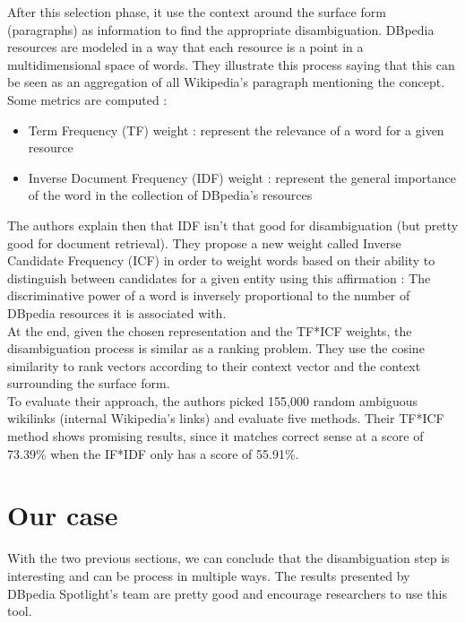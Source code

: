After this selection phase, it use the context around the surface form (paragraphs) as information to find the appropriate disambiguation. DBpedia resources are modeled in a way that each resource is a point in a multidimensional space of words. They illustrate this process saying that this can be seen as an aggregation of all Wikipedia's paragraph mentioning the concept. Some metrics are computed :
\begin{itemize}
	\item Term Frequency (TF) weight : represent the relevance of a word for a given resource
	\item Inverse Document Frequency (IDF) weight : represent the general importance of the word in the collection of DBpedia's resources
\end{itemize}
The authors explain then that IDF isn't that good for disambiguation (but pretty good for document retrieval). They propose a new weight called Inverse Candidate Frequency (ICF) in order to weight words based on their ability to distinguish between candidates for a given entity using this affirmation : The discriminative power of a word is inversely proportional to the number of DBpedia resources it is associated with.\\

At the end, given the chosen representation and the TF*ICF weights, the disambiguation process is similar as a ranking problem. They use the cosine similarity to rank vectors according to their context vector and the context surrounding  the surface form.\\

To evaluate their approach, the authors picked 155,000 random ambiguous wikilinks (internal Wikipedia's links) and evaluate five methods. Their TF*ICF method shows promising results, since it matches correct sense at a score of 73.39\% when the IF*IDF only has a score of 55.91\%.

\section{Our case} %
\label{sec:our_case}
With the two previous sections, we can conclude that the disambiguation step is interesting and can be process in multiple ways. The results presented by DBpedia Spotlight's team are pretty good and encourage researchers to use this tool.\\

